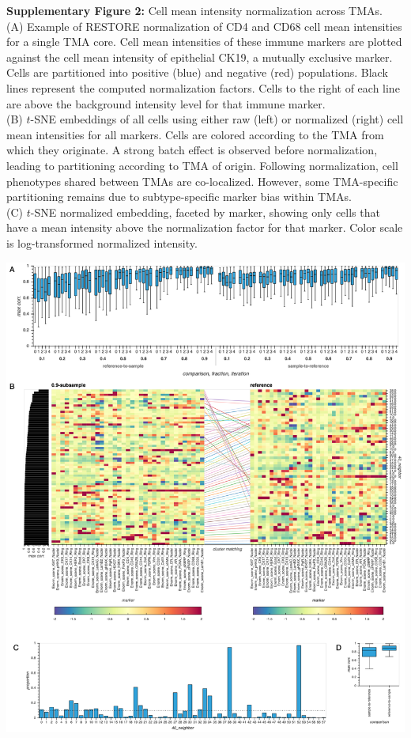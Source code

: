 \documentclass[preprint,review,3p,12pt]{elsarticle}
\begin{document}
\noindent
\textbf{Supplementary Figure 2:} Cell mean intensity normalization across TMAs.\\
(A) Example of RESTORE normalization \cite{Chang2020} of CD4 and CD68 cell mean intensities for a single TMA core. Cell mean intensities of these immune markers are plotted against the cell mean intensity of epithelial CK19, a mutually exclusive marker. Cells are partitioned into positive (blue) and negative (red) populations. Black lines represent the computed normalization factors. Cells to the right of each line are above the background intensity level for that immune marker.\\
(B) $t$-SNE embeddings of all cells using either raw (left) or normalized (right) cell mean intensities for all markers. Cells are colored according to the TMA from which they originate. A strong batch effect is observed before normalization, leading to partitioning according to TMA of origin. Following normalization, cell phenotypes shared between TMAs are co-localized. However, some TMA-specific partitioning remains due to subtype-specific marker bias within TMAs.\\
(C) $t$-SNE normalized embedding, faceted by marker, showing only cells that have a mean intensity above the normalization factor for that marker. Color scale is log-transformed normalized intensity.

\begin{suppfigure}[p]
\centering\includegraphics[width=\linewidth,
                 keepaspectratio]{suppfig3}
\caption{}
\label{fig:suppfig3}
\end{suppfigure}
\end{document}
